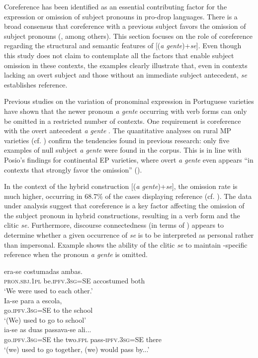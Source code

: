 \documentclass[output=paper]{langscibook}
\begin{document}
Coreference has been identified as an essential contributing factor for the expression or omission of subject pronouns in pro-drop languages. There is a broad consensus that coreference with a previous subject favors the omission of subject pronouns (\citealt{Silva-Corvalán1982}, among others). This section focuses on the role of coreference regarding the structural and semantic features of [(\textit{a gente})+\textit{se}]. Even though this study does not claim to contemplate all the factors that enable subject omission in these contexts, the examples clearly illustrate that, even in contexts lacking an overt subject and those without an immediate  subject antecedent, \textit{se} establishes  reference.



Previous studies on the variation of  pronominal expression in Portuguese varieties have shown that the newer pronoun \textit{a gente} occurring with  verb forms can only be omitted in a restricted number of contexts. One requirement is coreference with the overt antecedent \textit{a gente} \citep{Sória2013}. The quantitative analyses on rural MP varieties (cf. ) confirm the tendencies found in previous research: only five examples of null subject \textit{a gente} were found in the corpus. This is in line with Posio’s findings for continental EP varieties, where overt \textit{a gente} even appears “in contexts that strongly favor the omission” (\citeyear[345]{Posio2012}).



In the context of the hybrid construction [(\textit{a gente})+\textit{se}], the omission rate is much higher, occurring in 68.7\% of the cases displaying  reference (cf. ). The data under analysis suggest that coreference is a key factor affecting the omission of the subject pronoun in hybrid constructions, resulting in a  verb form and the clitic \textit{se.} Furthermore, discourse connectedness (in terms of \citealt{ParedesSilva1993}) appears to determine whether a given occurrence of \textit{se} is to be interpreted as personal rather than impersonal. Example  shows the ability of the clitic \textit{se} to maintain -specific reference when the pronoun \textit{a gente} is omitted.

\ea\label{ex:henriques:35}
  era-se costumadas ambas.\\
         \textsc{pron.sbj.1pl} be.\textsc{ipfv.3sg}=SE accostumed both\\
 \glt `We were used to each other.'\\
 \gll Ia-se para a escola,\\
         go.\textsc{ipfv.3sg}=SE to the school\\
 \glt `(We) used to go to school'\\
 \gll ia-se as duas passava-se ali...\\
         go.\textsc{ipfv.3sg}=SE the two.\textsc{fpl} pass-\textsc{ipfv.3sg}=SE there\\
 \glt `(we) used to go together, (we) would pass by...'
\z 
\end{document}
